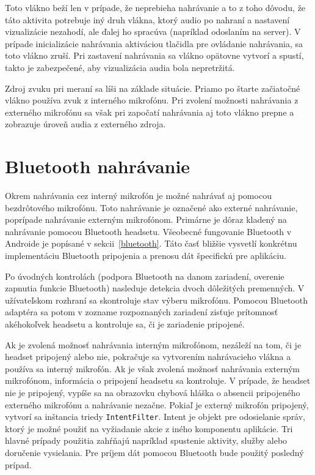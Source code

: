  Toto vlákno beží len v prípade, že neprebieha nahrávanie a to z toho dôvodu, že táto aktivita potrebuje iný druh vlákna, ktorý audio po nahraní a nastavení vizualizácie nezahodí, ale ďalej ho spracúva (napríklad odoslaním na server). V prípade inicializácie nahrávania aktiváciou tlačidla pre ovládanie nahrávania, sa toto vlákno zruší. Pri zastavení nahrávania sa vlákno opätovne vytvorí a spustí, takto je zabezpečené, aby vizualizácia audia bola nepretržitá.

Zdroj zvuku pri meraní sa líši na základe situácie. Priamo po štarte začiatočné vlákno používa zvuk z interného mikrofónu. Pri zvolení možnosti nahrávania z externého mikrofónu sa však pri započatí nahrávania aj toto vlákno prepne a zobrazuje úroveň audia z externého zdroja. 

\section{Bluetooth nahrávanie}
\label{external-recording}


Okrem nahrávania cez interný mikrofón je možné nahrávať aj pomocou bezdrôtového mikrofónu. Toto nahrávanie je označené ako externé nahrávanie, poprípade nahrávanie externým mikrofónom. Primárne je dôraz kladený na nahrávanie pomocou Bluetooth headsetu. Všeobecné fungovanie Bluetooth v Androide je popísané v sekcii~\ref{bluetooth}. Táto časť bližšie vysvetlí konkrétnu implementáciu Bluetooth pripojenia a prenosu dát špecifickú pre aplikáciu. 

Po úvodných kontrolách (podpora Bluetooth na danom zariadení, overenie zapnutia funkcie Bluetooth) nasleduje detekcia dvoch dôležitých premenných. V užívateľskom rozhraní sa skontroluje stav výberu mikrofónu. Pomocou Bluetooth adaptéra sa potom v zozname rozpoznaných zariadení zisťuje prítomnosť akéhokoľvek headsetu a kontroluje sa, či je zariadenie pripojené. 

Ak je zvolená možnosť nahrávania interným mikrofónom, nezáleží na tom, či je headset pripojený alebo nie, pokračuje sa vytvorením nahrávacieho vlákna a používa sa interný mikrofón. Ak je však zvolená možnosť nahrávania externým mikrofónom, informácia o pripojení headsetu sa kontroluje. V prípade, že headset nie je pripojený, vypíše sa na obrazovku chybová hláška o absencii pripojeného externého mikrofónu a nahrávanie nezačne. Pokiaľ je externý mikrofón pripojený, vytvorí sa inštancia triedy \texttt{IntentFilter}. Intent je objekt pre odosielanie správ, ktorý je možné použiť na vyžiadanie akcie z iného komponentu aplikácie\protect\footnotemark. Tri hlavné prípady použitia zahŕňajú napríklad spustenie aktivity, služby alebo doručenie vysielania. Pre príjem dát pomocou Bluetooth bude použitý posledný prípad.

